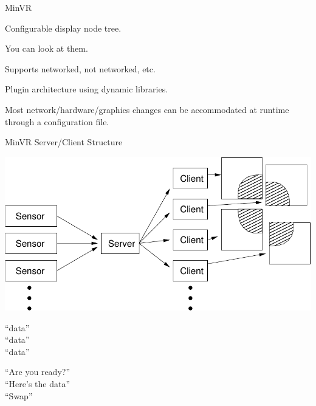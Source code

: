 \documentclass[12pt]{article}
\begin{document}
\begin{frame}{MinVR}

\begin{center}
\begin{minipage}{0.8\columnwidth}

\begin{description}\raggedright
\setlength{\itemsep}{10pt plus 7pt}
\item[Flexible display structure]  Configurable display node tree.

\item[Flexible events]  You can look at them.

\item[Varying network geometry]  Supports networked, not networked, etc.

\item[Extensible]  Plugin architecture using dynamic libraries.

\item[Configurable] Most network/hardware/graphics changes can be
  accommodated at runtime through a configuration file.

\end{description}


\end{minipage}
\end{center}
\end{frame}




\begin{frame}{MinVR Server/Client Structure}

\begin{center}

\includegraphics[width=0.9\columnwidth]{images/client-server.pdf}

\end{center}

\hspace{0.2\columnwidth}\begin{minipage}{0.2\columnwidth}
``data''\\
``data''\\
``data''\\
\end{minipage}
\hspace{0.02\columnwidth}\begin{minipage}{0.3\columnwidth}
``Are you ready?''\\
``Here's the data''\\
``Swap''
\end{minipage}

\end{frame}
\end{document}
